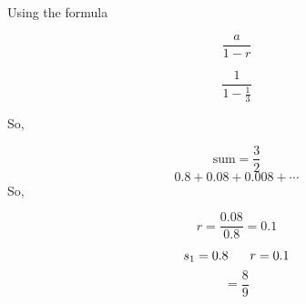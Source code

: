 \documentclass{report}
\begin{document}
Using the formula

$$\frac{a}{1-r}$$

$$\frac{1}{1-\frac{1}{3}}$$
\vspace{.5mm}

So,

$$\text{sum}= \frac{3}{2}$$
\bigbreak \noindent \bigbreak \noindent
{}
$$
0.8+0.08+0.008+\cdots
$$
So,

$$
r = \frac{0.08}{0.8}=0.1
$$

$$ s_1 = 0.8 \hspace{6mm} r = 0.1$$
$$= \frac{8}{9}$$
\pagebreak
\end{document}
